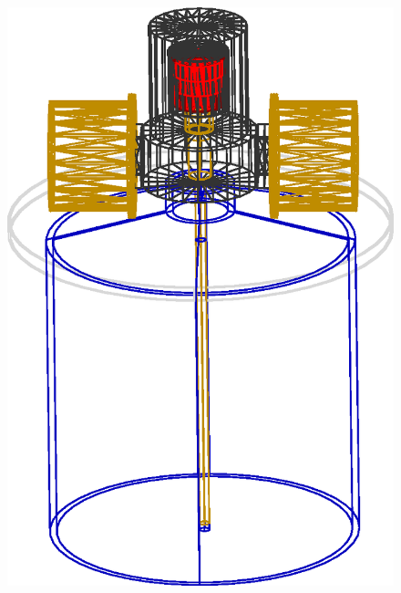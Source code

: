 \begin{figure}[tbhp]
  \centering
  \includegraphics[height=0.3\textheight,clip]{SIwired}\hfil

\end{figure}
